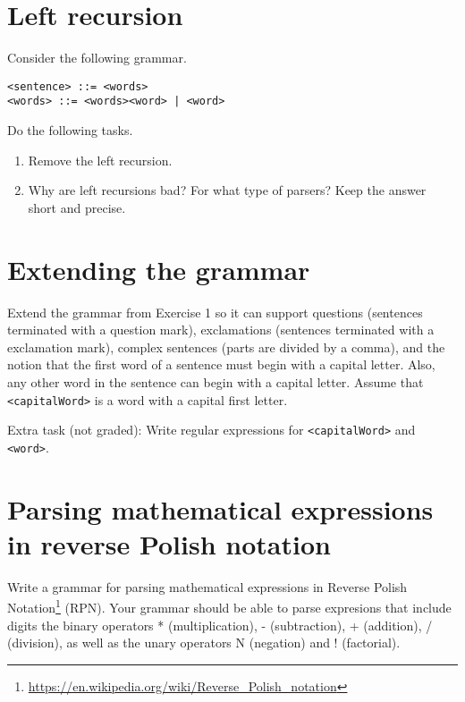 
\subtitle{Assignment 3: Parsing}


\makefancytitle

\section{Left recursion}


Consider the following grammar.
\begin{lstlisting}
<sentence> ::= <words>
<words> ::= <words><word> | <word>
\end{lstlisting}

Do the following tasks.
\begin{enumerate}
\item Remove the left recursion.
\item Why are left recursions bad? For what type of parsers? Keep the answer short and precise.
\end{enumerate}


\section{Extending the grammar}


Extend the grammar from Exercise 1 so it can support questions (sentences terminated with a question mark), exclamations (sentences terminated with a exclamation mark), complex sentences (parts are divided by a comma), and the notion that the first word of a sentence must begin with a capital letter. Also, any other word in the sentence can begin with a capital letter. Assume that \texttt{<capitalWord>} is a word with a capital first letter.

Extra task (not graded): Write regular expressions for \texttt{<capitalWord>} and \texttt{<word>}.


\section{Parsing mathematical expressions in reverse Polish notation}

Write a grammar for parsing mathematical expressions in Reverse Polish Notation\footnote{\url{https://en.wikipedia.org/wiki/Reverse_Polish_notation}} (RPN).
Your grammar should be able to parse expresions that include digits the binary operators * (multiplication), - (subtraction), + (addition), / (division), as well as the unary operators N (negation) and ! (factorial).

